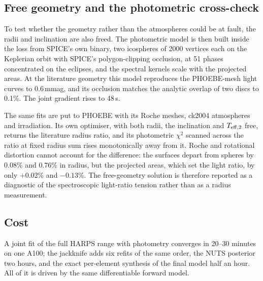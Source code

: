 \subsection{Free geometry and the photometric cross-check}

To test whether the geometry rather than the atmospheres could be at fault, the
radii and inclination are also freed. The photometric model is then built inside
the loss from SPICE's own binary, two icospheres of 2000 vertices each on the
Keplerian orbit with SPICE's polygon-clipping occlusion, at 51 phases
concentrated on the eclipses, and the spectral kernels scale with the projected
areas. At the literature geometry this model reproduces the PHOEBE-mesh light
curves to 0.6\,mmag, and its occlusion matches the analytic overlap of two discs
to 0.1\%. The joint gradient rises to 48\,s.

The same fits are put to PHOEBE with its Roche meshes, ck2004 atmospheres and
irradiation. Its own optimiser, with both radii, the inclination and
$T_{\rm eff,2}$ free, returns the literature radius ratio, and its photometric
$\chi^2$ scanned across the ratio at fixed radius sum rises monotonically away
from it. Roche and rotational distortion cannot account for the difference: the
surfaces depart from spheres by 0.08\% and 0.76\% in radius, but the projected
areas, which set the light ratio, by only $+0.02$\% and $-0.13$\%. The
free-geometry solution is therefore reported as a diagnostic of the
spectroscopic light-ratio tension rather than as a radius measurement.

\subsection{Cost}

A joint fit of the full HARPS range with photometry converges in 20--30
minutes on one A100; the jackknife adds six refits of the same order, the NUTS
posterior two hours, and the exact per-element synthesis of the final model
half an hour. All of it is driven by the same differentiable forward model.
